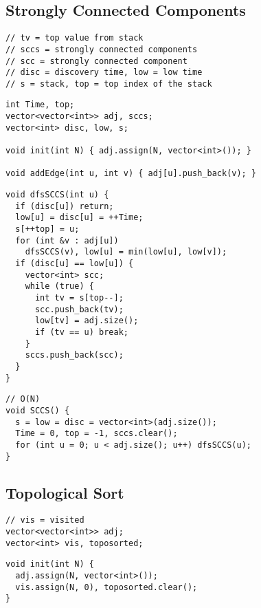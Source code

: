 \documentclass[twoside]{article}
\begin{document}
\begin{multicols*}{2}
\subsection*{Strongly Connected Components}
\begin{verbatim}
// tv = top value from stack
// sccs = strongly connected components
// scc = strongly connected component
// disc = discovery time, low = low time
// s = stack, top = top index of the stack
\end{verbatim}
\vspace{-12pt}
\begin{verbatim}
int Time, top;
vector<vector<int>> adj, sccs;
vector<int> disc, low, s;

void init(int N) { adj.assign(N, vector<int>()); }

void addEdge(int u, int v) { adj[u].push_back(v); }
\end{verbatim}
\vspace{-12pt}
\begin{verbatim}
void dfsSCCS(int u) {
  if (disc[u]) return;
  low[u] = disc[u] = ++Time;
  s[++top] = u;
  for (int &v : adj[u])
    dfsSCCS(v), low[u] = min(low[u], low[v]);
  if (disc[u] == low[u]) {
    vector<int> scc;
    while (true) {
      int tv = s[top--];
      scc.push_back(tv);
      low[tv] = adj.size();
      if (tv == u) break;
    }
    sccs.push_back(scc);
  }
}
\end{verbatim}
\vspace{-12pt}
\begin{verbatim}
// O(N)
void SCCS() {
  s = low = disc = vector<int>(adj.size());
  Time = 0, top = -1, sccs.clear();
  for (int u = 0; u < adj.size(); u++) dfsSCCS(u);
}
\end{verbatim}

\subsectionfont{\large\bfseries\sffamily\underline}
\subsection*{Topological Sort}
\begin{verbatim}
// vis = visited
vector<vector<int>> adj;
vector<int> vis, toposorted;
\end{verbatim}
\vspace{-12pt}
\begin{verbatim}
void init(int N) {
  adj.assign(N, vector<int>());
  vis.assign(N, 0), toposorted.clear();
}


\end{verbatim}
\end{multicols*}
\end{document}
